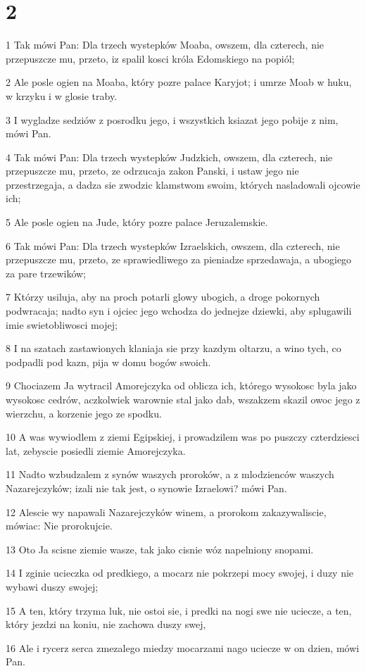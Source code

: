 \chapter{2}

\par 1 Tak mówi Pan: Dla trzech wystepków Moaba, owszem, dla czterech, nie przepuszcze mu, przeto, iz spalil kosci króla Edomskiego na popiól;
\par 2 Ale posle ogien na Moaba, który pozre palace Karyjot; i umrze Moab w huku, w krzyku i w glosie traby.
\par 3 I wygladze sedziów z posrodku jego, i wszystkich ksiazat jego pobije z nim, mówi Pan.
\par 4 Tak mówi Pan: Dla trzech wystepków Judzkich, owszem, dla czterech, nie przepuszcze mu, przeto, ze odrzucaja zakon Panski, i ustaw jego nie przestrzegaja, a dadza sie zwodzic klamstwom swoim, których nasladowali ojcowie ich;
\par 5 Ale posle ogien na Jude, który pozre palace Jeruzalemskie.
\par 6 Tak mówi Pan: Dla trzech wystepków Izraelskich, owszem, dla czterech, nie przepuszcze mu, przeto, ze sprawiedliwego za pieniadze sprzedawaja, a ubogiego za pare trzewików;
\par 7 Którzy usiluja, aby na proch potarli glowy ubogich, a droge pokornych podwracaja; nadto syn i ojciec jego wchodza do jednejze dziewki, aby splugawili imie swietobliwosci mojej;
\par 8 I na szatach zastawionych klaniaja sie przy kazdym oltarzu, a wino tych, co podpadli pod kazn, pija w domu bogów swoich.
\par 9 Chociazem Ja wytracil Amorejczyka od oblicza ich, którego wysokosc byla jako wysokosc cedrów, aczkolwiek warownie stal jako dab, wszakzem skazil owoc jego z wierzchu, a korzenie jego ze spodku.
\par 10 A was wywiodlem z ziemi Egipskiej, i prowadzilem was po puszczy czterdziesci lat, zebyscie posiedli ziemie Amorejczyka.
\par 11 Nadto wzbudzalem z synów waszych proroków, a z mlodzienców waszych Nazarejczyków; izali nie tak jest, o synowie Izraelowi? mówi Pan.
\par 12 Alescie wy napawali Nazarejczyków winem, a prorokom zakazywaliscie, mówiac: Nie prorokujcie.
\par 13 Oto Ja scisne ziemie wasze, tak jako cisnie wóz napelniony snopami.
\par 14 I zginie ucieczka od predkiego, a mocarz nie pokrzepi mocy swojej, i duzy nie wybawi duszy swojej;
\par 15 A ten, który trzyma luk, nie ostoi sie, i predki na nogi swe nie uciecze, a ten, który jezdzi na koniu, nie zachowa duszy swej,
\par 16 Ale i rycerz serca zmezalego miedzy mocarzami nago uciecze w on dzien, mówi Pan.

